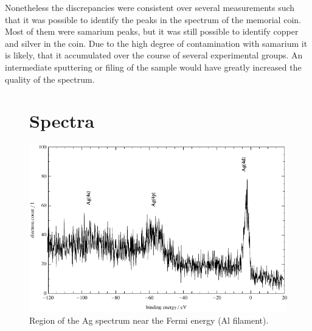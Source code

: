 \documentclass[a4paper]{scrartcl}
\numberwithin{equation}{section}
\numberwithin{figure}{section}
\numberwithin{table}{section}
\begin{document}
Nonetheless the discrepancies were consistent over several measurements such that it was possible to identify the peaks in the spectrum of the memorial coin. Most of them were samarium peaks, but it was still possible to identify copper and silver in the coin. Due to the high degree of contamination with samarium it is likely, that it accumulated over the course of several experimental groups. An intermediate sputtering or filing of the sample would have greatly increased the quality of the spectrum.





\clearpage
\begin{figure}
\section{Spectra}
  \centering
   	\includegraphics[width=\linewidth]{img/AgAlFermi.pdf}
 \caption{\small Region of the Ag spectrum near the Fermi energy (Al filament).}
        \label{fig:agfermi}
\end{figure}
\end{document}
